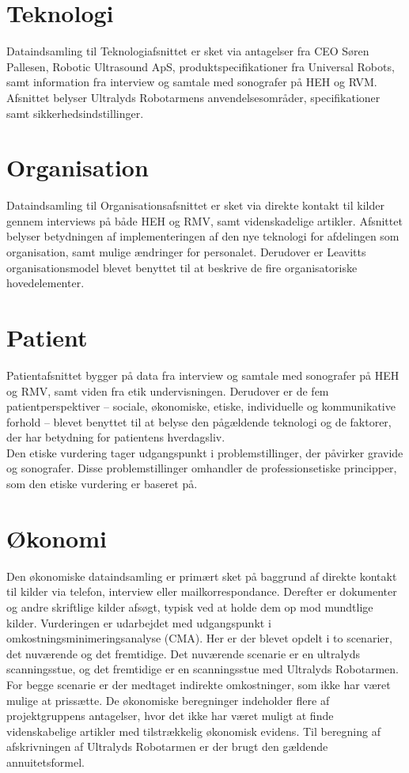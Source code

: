\section{Teknologi}
Dataindsamling til Teknologiafsnittet er sket via antagelser fra CEO Søren Pallesen, Robotic Ultrasound ApS, produktspecifikationer fra Universal Robots, samt information fra interview og samtale med sonografer på HEH og RVM. Afsnittet belyser Ultralyds Robotarmens anvendelsesområder, specifikationer samt sikkerhedsindstillinger.

\section{Organisation}
Dataindsamling til Organisationsafsnittet er sket via direkte kontakt til kilder gennem interviews på både HEH og RMV, samt videnskadelige artikler. Afsnittet belyser betydningen af implementeringen af den nye teknologi for afdelingen som organisation, samt mulige ændringer for personalet. Derudover er Leavitts organisationsmodel blevet benyttet til at beskrive de fire organisatoriske hovedelementer.

\section{Patient}
Patientafsnittet bygger på data fra interview og samtale med sonografer på HEH og RMV, samt viden fra etik undervisningen. Derudover er de fem patientperspektiver – sociale, økonomiske, etiske, individuelle og kommunikative forhold – blevet benyttet til at belyse den pågældende teknologi og de faktorer, der har betydning for patientens hverdagsliv.\\ 
Den etiske vurdering tager udgangspunkt i problemstillinger, der påvirker gravide og sonografer. Disse problemstillinger omhandler de professionsetiske principper, som den etiske vurdering er baseret på.


\section{Økonomi}
Den økonomiske dataindsamling er primært sket på baggrund af direkte kontakt til kilder via telefon, interview eller mailkorrespondance. Derefter er dokumenter og andre skriftlige kilder afsøgt, typisk ved at holde dem op mod mundtlige kilder. Vurderingen er udarbejdet med udgangspunkt i omkostningsminimeringsanalyse (CMA). Her er der blevet opdelt i to scenarier, det nuværende og det fremtidige. Det nuværende scenarie er en ultralyds scanningsstue, og det fremtidige er en scanningsstue med Ultralyds Robotarmen. For begge scenarie er der medtaget indirekte omkostninger, som ikke har været mulige at prissætte. De økonomiske beregninger indeholder flere af projektgruppens antagelser, hvor det ikke har været muligt at finde videnskabelige artikler med tilstrækkelig økonomisk evidens. Til beregning af afskrivningen af Ultralyds Robotarmen er der brugt den gældende annuitetsformel. 